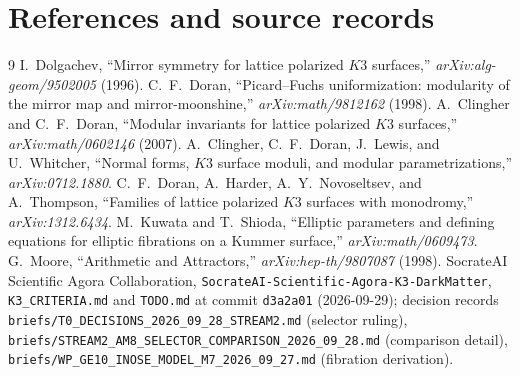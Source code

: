\documentclass[11pt,a4paper]{article}
\theoremstyle{remark}
\begin{document}
\section{References and source records}\label{sec:refs}

\begin{thebibliography}{9}
 I.~Dolgachev, ``Mirror symmetry for lattice polarized $K3$ surfaces,''
  \textit{arXiv:alg-geom/9502005} (1996).
 C.~F.~Doran, ``Picard--Fuchs uniformization: modularity of the mirror map and
  mirror-moonshine,'' \textit{arXiv:math/9812162} (1998).
 A.~Clingher and C.~F.~Doran, ``Modular invariants for lattice polarized $K3$ surfaces,''
  \textit{arXiv:math/0602146} (2007).
 A.~Clingher, C.~F.~Doran, J.~Lewis, and U.~Whitcher, ``Normal forms, $K3$ surface moduli,
  and modular parametrizations,'' \textit{arXiv:0712.1880}.
 C.~F.~Doran, A.~Harder, A.~Y.~Novoseltsev, and A.~Thompson, ``Families of lattice polarized
  $K3$ surfaces with monodromy,'' \textit{arXiv:1312.6434}.
 M.~Kuwata and T.~Shioda, ``Elliptic parameters and defining equations for elliptic
  fibrations on a Kummer surface,'' \textit{arXiv:math/0609473}.
 G.~Moore, ``Arithmetic and Attractors,'' \textit{arXiv:hep-th/9807087} (1998).
 SocrateAI Scientific Agora Collaboration, \texttt{SocrateAI-Scientific-Agora-K3-DarkMatter},
  \texttt{K3\_CRITERIA.md} and \texttt{TODO.md} at commit \texttt{d3a2a01} (2026-09-29); decision records
  \texttt{briefs/T0\_DECISIONS\_2026\_09\_28\_STREAM2.md} (selector ruling),
  \texttt{briefs/STREAM2\_AM8\_SELECTOR\_COMPARISON\_2026\_09\_28.md} (comparison detail),
  \texttt{briefs/WP\_GE10\_INOSE\_MODEL\_M7\_2026\_09\_27.md} (fibration derivation).
\end{thebibliography}
\end{document}
